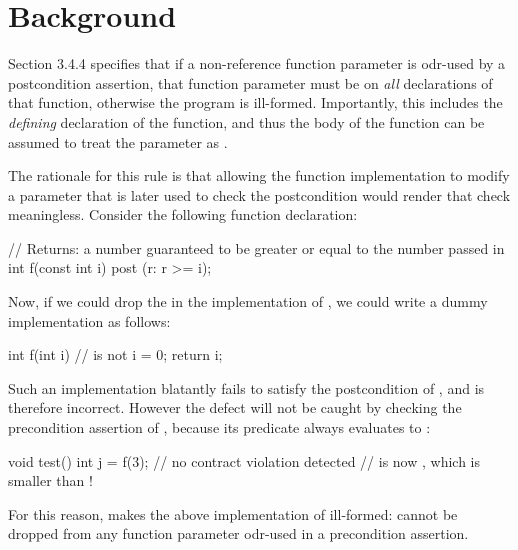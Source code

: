





\section{Background}
\label{bg}

\cite{P2900R10} Section 3.4.4 specifies that if a non-reference function parameter is odr-used by a postcondition assertion, that function parameter must be  on \emph{all} declarations of that function, otherwise the program is ill-formed.  Importantly, this includes the \emph{defining} declaration of the function, and thus the body of the function can be assumed to treat the parameter as .

The rationale for this rule is that allowing the function implementation to modify a parameter that is later used to check the postcondition would render that check meaningless. Consider the following function declaration:
\begin{codeblock}
// Returns: a number guaranteed to be greater or equal to the number passed in
int f(const int i) post (r: r >= i);
\end{codeblock}
Now, if we could drop the  in the implementation of , we could write a dummy implementation as follows:
\begin{codeblock}
int f(int i) {  //  is not 
  i = 0;
  return i;
}
\end{codeblock}
Such an implementation blatantly fails to satisfy the postcondition of , and is therefore incorrect. However the defect will not be caught by checking the precondition assertion of , because its predicate always evaluates to :
\begin{codeblock}
void test() {
  int j = f(3); // no contract violation detected
  //  is now , which is smaller than !
}
\end{codeblock}
For this reason, \cite{P2900R10} makes the above implementation of  ill-formed:  cannot be dropped from any function parameter odr-used in a precondition assertion.

